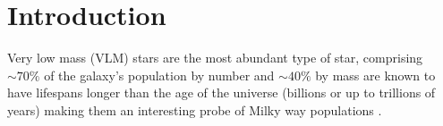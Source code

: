 \documentclass[modern]{aastex62}
\begin{document}
 
\section{Introduction} \label{sec:intro}

Very low mass (VLM) stars are the most abundant type of star, comprising $\sim 70 \%$ of the galaxy's population by number \citep{Bochanski:2010} and $\sim 40 \%$ by mass are known to have lifespans longer than the age of the universe (billions or up to trillions of years) \citep{Laughlin:1997} making them an interesting probe of Milky way populations \citep{Bochanski:2007}.


\end{document}
